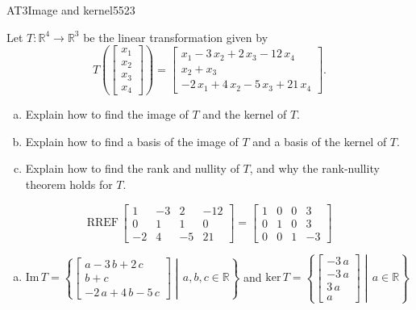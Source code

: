 \begin{exercise}{AT3}{Image and kernel}{5523} 
\begin{exerciseStatement} 

 Let \(T:\mathbb{R}^4 \to \mathbb{R}^3\) be the linear transformation given by \[T\left( \left[\begin{array}{c}
x_{1} \\
x_{2} \\
x_{3} \\
x_{4}
\end{array}\right] \right) = \left[\begin{array}{c}
x_{1} - 3 \, x_{2} + 2 \, x_{3} - 12 \, x_{4} \\
x_{2} + x_{3} \\
-2 \, x_{1} + 4 \, x_{2} - 5 \, x_{3} + 21 \, x_{4}
\end{array}\right].\] 

 

\begin{enumerate}[(a)]
\item Explain how to find the image of \(T\) and the kernel of \(T\).
\item Explain how to find a basis of the image of \(T\) and a basis of the kernel of \(T\).
\item Explain how to find the rank and nullity of \(T\), and why the rank-nullity theorem holds for \(T\).
\end{enumerate}

     \end{exerciseStatement}
 \begin{exerciseAnswer} 

\[\mathrm{RREF}\,\left[\begin{array}{cccc}
1 & -3 & 2 & -12 \\
0 & 1 & 1 & 0 \\
-2 & 4 & -5 & 21
\end{array}\right]=\left[\begin{array}{cccc}
1 & 0 & 0 & 3 \\
0 & 1 & 0 & 3 \\
0 & 0 & 1 & -3
\end{array}\right]\]

 

\begin{enumerate}[(a)]
\item  

 \(\mathrm{Im}\,T =  \left\{ \left[\begin{array}{c}
a - 3 \, b + 2 \, c \\
b + c \\
-2 \, a + 4 \, b - 5 \, c
\end{array}\right] \middle|\,a,b,c\in\mathbb{R}\right\}\) and \(\mathrm{ker}\,T = \left\{ \left[\begin{array}{c}
-3 \, a \\
-3 \, a \\
3 \, a \\
a
\end{array}\right] \middle|\,a\in\mathbb{R}\right\}\) 


\end{enumerate}
\end{exerciseAnswer}
\end{exercise}
